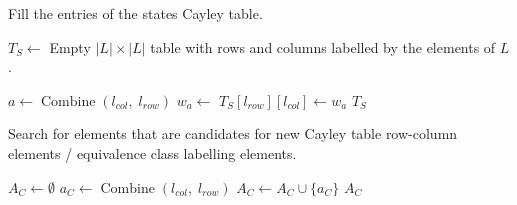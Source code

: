 \begin{algorithm}[H]
	\caption{
		Fill the entries of the states Cayley table.
	}
	\hrulefill
	\begin{algorithmic}[1]
		\State $T_{S} \gets$ Empty $|L| \times |L|$ table with rows and columns labelled by the elements of $L$.

		\State $a \gets \operatorname{Combine}(l_{col}, \; l_{row})$
		\State $w_{a} \gets$ 
		\State $T_{S}[l_{row}][l_{col}] \gets w_{a}$
		\EndFor
		\EndFor
		\State \Return $T_{S}$
		\EndProcedure
	\end{algorithmic}
\end{algorithm}


\begin{algorithm}[H]
	\caption{Search for elements that are candidates for new Cayley table row-column elements / equivalence class labelling elements.}
	\hrulefill
	\begin{algorithmic}[1]
		\State $A_{C} \gets \emptyset$
		\State $a_{C} \gets \operatorname{Combine}(l_{col}, \; l_{row})$
		\Statex {}
		\State $A_{C} \gets A_{C} \cup \{a_{C}\}$
		\EndIf
		\EndFor
		\EndFor
		\State \Return $A_{C}$
		\EndProcedure
	\end{algorithmic}
\end{algorithm}


